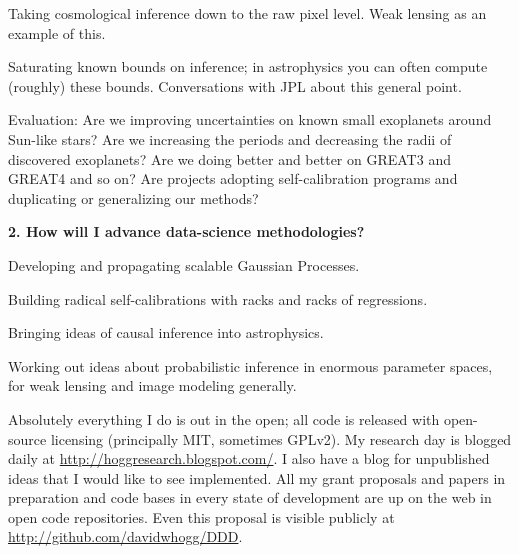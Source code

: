 \documentclass[11pt, letterpaper]{article}
\begin{document}
Taking cosmological inference down to the raw pixel level.  Weak
lensing as an example of this.

Saturating known bounds on inference; in astrophysics you can often
compute (roughly) these bounds.  Conversations with JPL about this
general point.

Evaluation: Are we improving uncertainties on known small exoplanets
around Sun-like stars?  Are we increasing the periods and decreasing
the radii of discovered exoplanets?  Are we doing better and better on
GREAT3 and GREAT4 and so on?  Are projects adopting self-calibration
programs and duplicating or generalizing our methods?

\bigskip
\noindent\textbf{2. How will I advance data-science methodologies?}
\smallskip

Developing and propagating scalable Gaussian Processes.

Building radical self-calibrations with racks and racks of regressions.

Bringing ideas of causal inference into astrophysics.

Working out ideas about probabilistic inference in enormous parameter spaces,
for weak lensing and image modeling generally.

Absolutely everything I do is out in the open; all code is released
with open-source licensing (principally MIT, sometimes GPLv2).
My research day is blogged daily at
\url{http://hoggresearch.blogspot.com/}.
I also have a blog for unpublished ideas that I would like to see
implemented.
All my grant proposals and papers in preparation and code bases in
every state of development are up on the web in open code
repositories.
Even this proposal is visible publicly at
\url{http://github.com/davidwhogg/DDD}.
\end{document}

